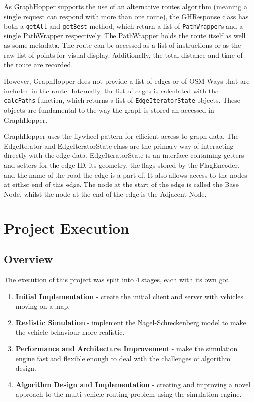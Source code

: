 \documentclass[ %
                    author={Alexander Hill},
                supervisor={Dr. Benjamin Sach},
                    degree={MEng},
                     title={MARMOSET},
                  subtitle={Multi-Agent Route Management using Online Simulation for Efficient Transportation},
                      type={research},
                      year={2016} ]{dissertation}
\begin{document}
As GraphHopper supports the use of an alternative routes algorithm (meaning a
single request can respond with more than one route), the GHResponse class has
both a \texttt{getAll} and \texttt{getBest} method, which return a list of
\texttt{PathWrapper}s and a single PathWrapper respectively. The PathWrapper
holds the route itself as well as some metadata. The route can be accessed as a
list of instructions or as the raw list of points for visual display.
Additionally, the total distance and time of the route are recorded.

However, GraphHopper does not provide a list of edges or of OSM Ways that are
included in the route. Internally, the list of edges is calculated with the
\texttt{calcPaths} function, which returns a list of \texttt{EdgeIteratorState}
objects. These objects are fundamental to the way the graph is stored an
accessed in GraphHopper.

GraphHopper uses the flywheel pattern for efficient access to graph data. The
EdgeIterator and EdgeIteratorState class are the primary way of interacting
directly with the edge data. EdgeIteratorState is an interface containing
getters and setters for the edge ID, its geometry, the flags stored by the
FlagEncoder, and the name of the road the edge is a part of. It also allows
access to the nodes at either end of this edge. The node at the start of the
edge is called the Base Node, whilst the node at the end of the edge is the
Adjacent Node.


\chapter{Project Execution}
\label{chap:execution}


\section{Overview}

The execution of this project was split into 4 stages, each with its own goal.

\begin{enumerate}
    \item \textbf{Initial Implementation} - create the initial client and
        server with vehicles moving on a map.
    \item \textbf{Realistic Simulation} - implement the Nagel-Schreckenberg
        model to make the vehicle behaviour more realistic.
    \item \textbf{Performance and Architecture Improvement} - make the
        simulation engine fast and flexible enough to deal with the challenges
        of algorithm design.
    \item \textbf{Algorithm Design and Implementation} - creating and improving
        a novel approach to the multi-vehicle routing problem using the
        simulation engine.
\end{enumerate}
\end{document}
